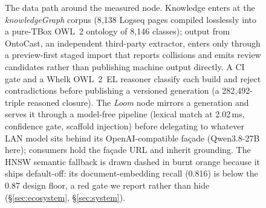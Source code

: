 \begin{figure}[t]
{}
\caption{The data path around the measured node. Knowledge enters at the \emph{knowledgeGraph} corpus
(8{,}138 Logseq pages compiled losslessly into a pure-TBox OWL~2 ontology of 8{,}146 classes); output
from OntoCast, an independent third-party extractor, enters only through a preview-first staged import
that reports collisions and emits review candidates rather than publishing machine output directly. A
CI gate and a Whelk OWL~2~EL reasoner classify each build and reject contradictions before publishing a
versioned generation (a 282{,}492-triple reasoned closure). The \emph{Loom} node mirrors a generation
and serves it through a model-free pipeline (lexical match at 2.02\,ms, confidence gate, scaffold
injection) before delegating to whatever LAN model sits behind its OpenAI-compatible fa\c{c}ade
(Qwen3.8-27B here); consumers hold the fa\c{c}ade URL and inherit grounding. The HNSW semantic fallback
is drawn dashed in burnt orange because it ships default-off: its document-embedding recall (0.816) is
below the 0.87 design floor, a red gate we report rather than hide (\S\ref{sec:ecosystem},
\S\ref{sec:system}).}
\label{fig:ecosystem}
\end{figure}
